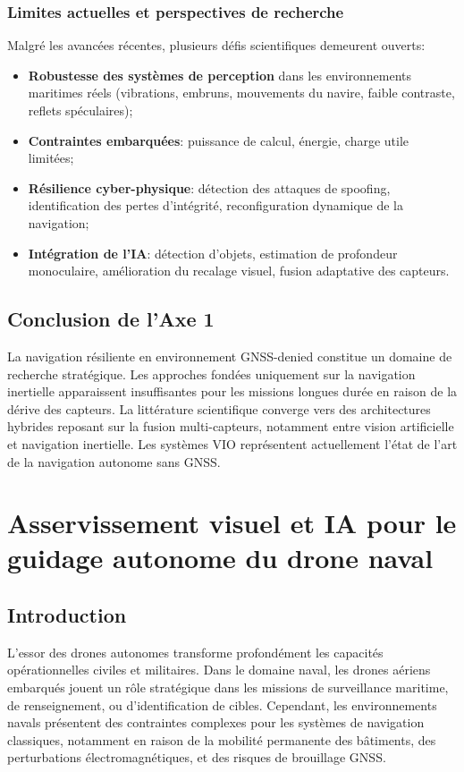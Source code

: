 \documentclass[12pt, a4paper, twoside, openright]{report}
\begin{document}
\subsection{Limites actuelles et perspectives de recherche}
Malgré les avancées récentes, plusieurs défis scientifiques demeurent ouverts:
\begin{itemize}
    \item \textbf{Robustesse des systèmes de perception} dans les environnements maritimes réels (vibrations, embruns, mouvements du navire, faible contraste, reflets spéculaires);
    \item \textbf{Contraintes embarquées}: puissance de calcul, énergie, charge utile limitées;
    \item \textbf{Résilience cyber-physique}: détection des attaques de spoofing, identification des pertes d’intégrité, reconfiguration dynamique de la navigation;
    \item \textbf{Intégration de l’IA}: détection d’objets, estimation de profondeur monoculaire, amélioration du recalage visuel, fusion adaptative des capteurs.
\end{itemize}

\section{Conclusion de l'Axe 1}
La navigation résiliente en environnement GNSS-denied constitue un domaine de recherche stratégique. Les approches fondées uniquement sur la navigation inertielle apparaissent insuffisantes pour les missions longues durée en raison de la dérive des capteurs. La littérature scientifique converge vers des architectures hybrides reposant sur la fusion multi-capteurs, notamment entre vision artificielle et navigation inertielle. Les systèmes VIO représentent actuellement l’état de l’art de la navigation autonome sans GNSS.

\cleardoublepage
\chapter{Asservissement visuel et IA pour le guidage autonome du drone naval}\label{chap:axe2}

\section{Introduction}
L’essor des drones autonomes transforme profondément les capacités opérationnelles civiles et militaires. Dans le domaine naval, les drones aériens embarqués jouent un rôle stratégique dans les missions de surveillance maritime, de renseignement, ou d’identification de cibles. Cependant, les environnements navals présentent des contraintes complexes pour les systèmes de navigation classiques, notamment en raison de la mobilité permanente des bâtiments, des perturbations électromagnétiques, et des risques de brouillage GNSS.
\end{document}
